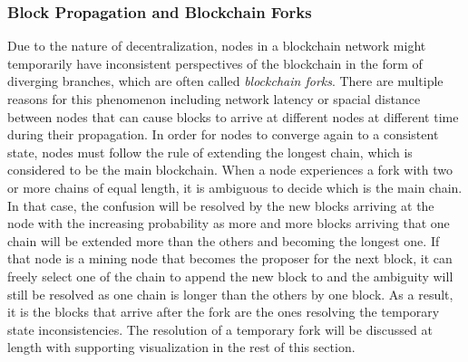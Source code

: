 \subsubsection{Block Propagation and Blockchain Forks}

Due to the nature of decentralization, nodes in a blockchain network might temporarily have inconsistent perspectives of the blockchain in the form of diverging branches, which are often called \textit{blockchain forks}. There are multiple reasons for this phenomenon including network latency or spacial distance between nodes that can cause blocks to arrive at different nodes at different time during their propagation. In order for nodes to converge again to a consistent state, nodes must follow the rule of extending the longest chain, which is considered to be the main blockchain. When a node experiences a fork with two or more chains of equal length, it is ambiguous to decide which is the main chain. In that case, the confusion will be resolved by the new blocks arriving at the node with the increasing probability as more and more blocks arriving that one chain will be extended more than the others and becoming the longest one. If that node is a mining node that becomes the proposer for the next block, it can freely select one of the chain to append the new block to and the ambiguity will still be resolved as one chain is longer than the others by one block. As a result, it is the blocks that arrive after the fork are the ones resolving the temporary state inconsistencies. The resolution of a temporary fork will be discussed at length with supporting visualization in the rest of this section.

